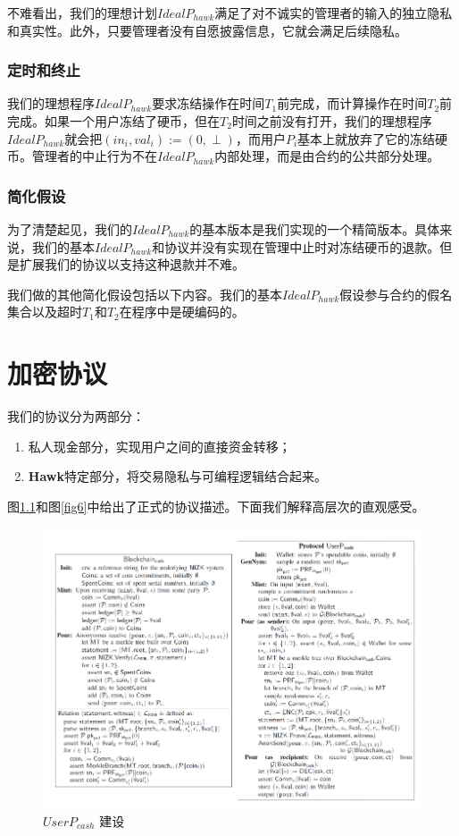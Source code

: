 \documentclass{xduugtrans}
\begin{document}
不难看出，我们的理想计划$IdealP_{hawk}$满足了对不诚实的管理者的输入的独立隐私和真实性。此外，只要管理者没有自愿披露信息，它就会满足后续隐私。

\subsection{定时和终止}

我们的理想程序$IdealP_{hawk}$要求冻结操作在时间$T_1$前完成，而计算操作在时间$T_2$前完成。如果一个用户冻结了硬币，但在$T_2$时间之前没有打开，我们的理想程序$IdealP_{hawk}$就会把$(in_i,val_i) := (0, \perp )$，而用户$P_i$基本上就放弃了它的冻结硬币。管理者的中止行为不在$IdealP_{hawk}$内部处理，而是由合约的公共部分处理。

\subsection{简化假设}

为了清楚起见，我们的$IdealP_{hawk}$的基本版本是我们实现的一个精简版本。具体来说，我们的基本$IdealP_{hawk}$和协议并没有实现在管理中止时对冻结硬币的退款。但是扩展我们的协议以支持这种退款并不难。

我们做的其他简化假设包括以下内容。我们的基本$IdealP_{hawk}$假设参与合约的假名集合以及超时$T_1$和$T_2$在程序中是硬编码的。

\chapter{加密协议}

我们的协议分为两部分：

\begin{enumerate}
    \item 私人现金部分，实现用户之间的直接资金转移；
    \item \textbf{Hawk}特定部分，将交易隐私与可编程逻辑结合起来。
\end{enumerate}

图\ref{fig5}和图\ref{fig6}中给出了正式的协议描述。下面我们解释高层次的直观感受。

\begin{figure}
    \centering
    \includegraphics[width=.9\linewidth]{5}
    \caption{$UserP_{cash}$ 建设}
    \label{fig5}
\end{figure}
\end{document}
